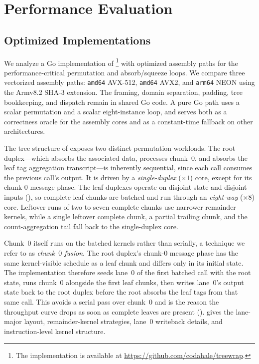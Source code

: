 \section{Performance Evaluation}
\label{sec:performance}

\subsection{Optimized Implementations}
\label{sec:impl}

We analyze a Go implementation of \TW{}\footnote{The implementation is available
at \url{https://github.com/codahale/treewrap}.} with optimized assembly paths
for the performance-critical permutation and absorb/squeeze loops. We
compare three vectorized assembly paths: \texttt{amd64} AVX-512,
\texttt{amd64} AVX2, and \texttt{arm64} NEON using the Armv8.2 SHA-3
extension. The framing, domain separation, padding, tree bookkeeping, and
dispatch remain in shared Go code. A pure Go path uses a scalar permutation
and a scalar eight-instance loop, and serves both as a correctness oracle for
the assembly cores and as a constant-time fallback on other architectures.

The tree structure of \TW{} exposes two distinct permutation workloads. The
root duplex---which absorbs the associated data, processes chunk~$0$, and
absorbs the leaf tag aggregation transcript---is inherently sequential, since
each call consumes the previous call's output. It is driven by a
\emph{single-duplex} ($\times 1$) core, except for its chunk-$0$ message phase.
The leaf duplexes operate on disjoint state and disjoint inputs
(), so complete leaf chunks are batched and run through an
\emph{eight-way} ($\times 8$) core. Leftover runs of two to seven complete
chunks use narrower remainder kernels, while a single leftover complete chunk,
a partial trailing chunk, and the count-aggregation tail fall back to the
single-duplex core.

Chunk~$0$ itself runs on the batched kernels rather than serially, a technique
we refer to as \emph{chunk~$0$ fusion}. The root duplex's chunk-$0$ message phase
has the same kernel-visible schedule as a leaf chunk and differs only in its
initial state. The implementation therefore seeds lane~$0$ of the first batched
call with the root state, runs chunk~$0$ alongside the first leaf chunks, then
writes lane~$0$'s output state back to the root duplex before the root absorbs
the leaf tags from that same call. This avoids a serial pass over chunk~$0$ and
is the reason the throughput curve drops as soon as complete leaves are present
().  gives the lane-major layout,
remainder-kernel strategies, lane~$0$ writeback details, and instruction-level
kernel structure.

